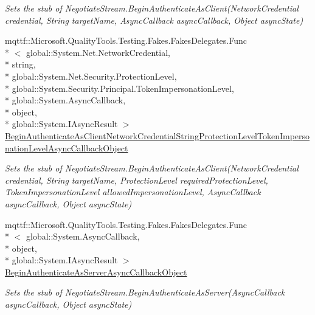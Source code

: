 \begin{DoxyCompactItemize}
\begin{DoxyCompactList}\small\item\em Sets the stub of Negotiate\-Stream.\-Begin\-Authenticate\-As\-Client(\-Network\-Credential credential, String target\-Name, Async\-Callback async\-Callback, Object async\-State)\end{DoxyCompactList}\item 
mqttf\-::\-Microsoft.\-Quality\-Tools.\-Testing.\-Fakes.\-Fakes\-Delegates.\-Func\\*
$<$ global\-::\-System.\-Net.\-Network\-Credential, \\*
string, \\*
global\-::\-System.\-Net.\-Security.\-Protection\-Level, \\*
global\-::\-System.\-Security.\-Principal.\-Token\-Impersonation\-Level, \\*
global\-::\-System.\-Async\-Callback, \\*
object, \\*
global\-::\-System.\-I\-Async\-Result $>$ \hyperlink{class_system_1_1_net_1_1_security_1_1_fakes_1_1_stub_negotiate_stream_aed68e55d3c09aaba9c24aa764355862b}{Begin\-Authenticate\-As\-Client\-Network\-Credential\-String\-Protection\-Level\-Token\-Impersonation\-Level\-Async\-Callback\-Object}
\begin{DoxyCompactList}\small\item\em Sets the stub of Negotiate\-Stream.\-Begin\-Authenticate\-As\-Client(\-Network\-Credential credential, String target\-Name, Protection\-Level required\-Protection\-Level, Token\-Impersonation\-Level allowed\-Impersonation\-Level, Async\-Callback async\-Callback, Object async\-State)\end{DoxyCompactList}\item 
mqttf\-::\-Microsoft.\-Quality\-Tools.\-Testing.\-Fakes.\-Fakes\-Delegates.\-Func\\*
$<$ global\-::\-System.\-Async\-Callback, \\*
object, \\*
global\-::\-System.\-I\-Async\-Result $>$ \hyperlink{class_system_1_1_net_1_1_security_1_1_fakes_1_1_stub_negotiate_stream_ae224f971204ea772a44f7028afa30318}{Begin\-Authenticate\-As\-Server\-Async\-Callback\-Object}
\begin{DoxyCompactList}\small\item\em Sets the stub of Negotiate\-Stream.\-Begin\-Authenticate\-As\-Server(\-Async\-Callback async\-Callback, Object async\-State)\end{DoxyCompactList}\item 

\end{DoxyCompactItemize}

